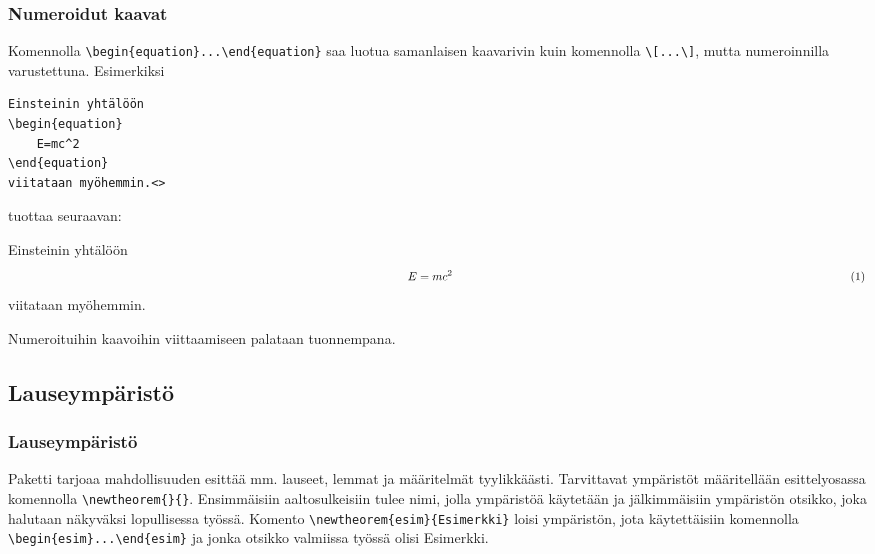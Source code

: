 \begin{frame}[fragile]
    \frametitle{Numeroidut kaavat}
Komennolla \lstinline-\begin{equation}...\end{equation}- saa luotua samanlaisen kaavarivin kuin komennolla \lstinline-\[...\]-, mutta numeroinnilla varustettuna. \pause Esimerkiksi

    \begin{lstlisting}
Einsteinin yhtälöön
\begin{equation}
    E=mc^2
\end{equation}
viitataan myöhemmin.<>
    \end{lstlisting}
    tuottaa seuraavan:
    \begin{sample}
        Einsteinin yhtälöön
        \begin{equation*}
            \hskip\textwidth minus \textwidth E=mc^2 \hskip\textwidth minus \textwidth (1)
        \end{equation*}
        viitataan myöhemmin.
    \end{sample}
    \pause
    Numeroituihin kaavoihin viittaamiseen palataan tuonnempana.
\end{frame}

\begin{frame}[fragile]
    
\end{frame}


\subsection{Lauseympäristö}
\begin{frame}[fragile]
    \frametitle{Lauseympäristö}
    Paketti  tarjoaa mahdollisuuden esittää mm. lauseet, lemmat ja määritelmät tyylikkäästi. 
    \vaihto
    Tarvittavat ympäristöt määritellään esittelyosassa komennolla \lstinline-\newtheorem{}{}-. Ensimmäisiin aaltosulkeisiin tulee nimi, jolla ympäristöä käytetään ja jälkimmäisiin ympäristön otsikko, joka halutaan näkyväksi lopullisessa työssä.
    \vaihto
Komento \lstinline-\newtheorem{esim}{Esimerkki}- loisi ympäristön, jota käytettäisiin komennolla \lstinline-\begin{esim}...\end{esim}- ja jonka otsikko valmiissa työssä olisi Esimerkki. 
\end{frame}

